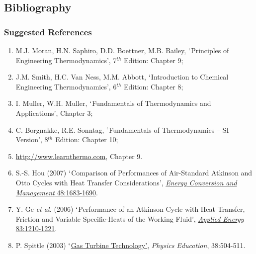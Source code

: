 \documentclass[10pt,compress]{beamer}
\begin{document}
\subsection{Bibliography} 
\begin{frame}
 \frametitle{Suggested References}
  \begin{enumerate}[1]\scriptsize
   \item M.J. Moran, H.N. Saphiro, D.D. Boettner, M.B. Bailey, $\lq$Principles of Engineering Thermodynamics',  7$^{th}$ Edition: Chapter 9;
   \item J.M. Smith, H.C. Van Ness, M.M. Abbott, $\lq$Introduction to Chemical Engineering Thermodynamics', 6$^{th}$ Edition: Chapter 8;
   \item I. Muller, W.H. Muller, $\lq$Fundamentals of Thermodynamics and Applications', Chapter 3;
   \item C. Borgnakke, R.E. Sonntag, $\lq$Fundamentals of Thermodynamics -- SI Version', 8$^{th}$ Edition: Chapter 10;
   \item \href{http://www.learnthermo.com}{http://www.learnthermo.com}, Chapter 9.
   \item S.-S. Hou (2007) $\lq$Comparison of Performances of Air-Standard Atkinson and Otto Cycles with Heat Transfer Considerations', \href{http://dx.doi.org/10.1016/j.enconman.2006.11.001}{{\it Energy Conversion and Management} 48:1683-1690}.
   \item Y. Ge {\it et al.} (2006) $\lq$Performance of an Atkinson Cycle with Heat Transfer, Friction and Variable Specific-Heats of the Working Fluid', \href{http://dx.doi.org/10.1016/j.apenergy.2005.12.003}{{\it Applied Energy} 83:1210-1221}.
   \item P. Spittle (2003) \href{http://dx.doi.org/10.1088/0031-9120/38/6/002}{$\lq$Gas Turbine Technology'}, {\it Physics Education}, 38:504-511.
  \end{enumerate}
\end{frame}


\end{document}
